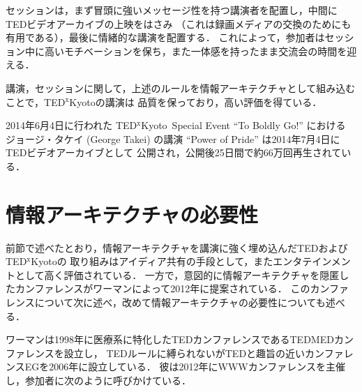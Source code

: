\documentclass[submit,techreq,jkeyword,noauthor]{ipsj}
\newcommand{\TED}{\textrm{TED}}
\newcommand{\TEDMED}{\textrm{TEDMED}}
\newcommand{\TEDx}{\TED${}^{\textrm{x}}$}
\newcommand{\TEDxKyoto}{\TEDx\textrm{Kyoto}}
\begin{document}
セッションは，まず冒頭に強いメッセージ性を持つ講演者を配置し，中間に\TED ビデオアーカイブの上映をはさみ
（これは録画メディアの交換のためにも有用である），最後に情緒的な講演を配置する．
これによって，参加者はセッション中に高いモチベーションを保ち，また一体感を持ったまま交流会の時間を迎える．

講演，セッションに関して，上述のルールを情報アーキテクチャとして組み込むことで，\TEDxKyoto の講演は
品質を保っており，高い評価を得ている．\cite{ml}

2014年6月4日に行われた \TEDxKyoto\ Special Event ``To Boldly Go!'' における
ジョージ・タケイ (George Takei) の講演 ``Power of Pride'' は2014年7月4日に\TED ビデオアーカイブとして
公開され，公開後25日間で約66万回再生されている．\cite{gt}



\section{情報アーキテクチャの必要性}

前節で述べたとおり，情報アーキテクチャを講演に強く埋め込んだ\TED および\TEDxKyoto の
取り組みはアイディア共有の手段として，またエンタテインメントとして高く評価されている．
一方で，意図的に情報アーキテクチャを隠匿したカンファレンスがワーマンによって2012年に提案されている．
このカンファレンスについて次に述べ，改めて情報アーキテクチャの必要性についても述べる．

ワーマンは1998年に医療系に特化した\TED カンファレンスである\TEDMED カンファレンスを設立し，
\TED ルールに縛られないが\TED と趣旨の近いカンファレンスEGを2006年に設立している．
彼は2012年にWWWカンファレンスを主催し，参加者に次のように呼びかけている．\cite{wwwweb}
\end{document}
